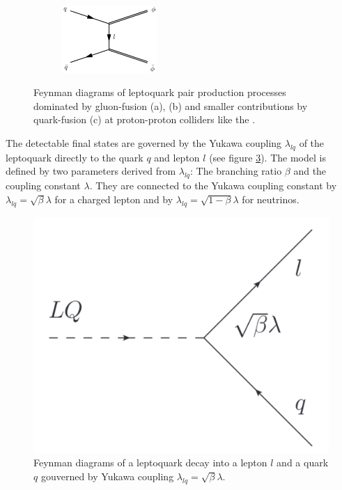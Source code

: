 \begin{figure}
\begin{subfigure}[t]{0.9\textwidth}
                \includegraphics[width=0.4\textwidth]{figures/qff.pdf}
                \label{qfc}
                \end{subfigure}
%
\caption[Feynman diagrams of leptoquark pair production processes at proton-proton colliders like the {\LHC}.]{Feynman diagrams of leptoquark pair production processes dominated by gluon-fusion (a), (b) and smaller contributions by quark-fusion (c) at proton-proton colliders like the {\LHC}. \cite{hunter}}
\label{LQpairs}
\end{figure}
%
%
%
%
%
The detectable final states are governed by the Yukawa coupling $\lambda_{lq}$ of the leptoquark directly to the quark $q$ and lepton $l$ (see figure \ref{YukawaLQ}). The model is defined by two parameters derived from $\lambda_{lq}$: The branching ratio $\beta$ and the coupling constant $\lambda$. They are connected to the Yukawa coupling constant by $\lambda_{lq}=\sqrt{\beta}\lambda$ for a charged lepton and by $\lambda_{lq}=\sqrt{1-\beta}\lambda$ for neutrinos. \cite{currentStatus:13TeVATLAS}\par
%
\begin{figure}[htbp]                                 
 \begin{center}                                       
  \includegraphics[width=0.4\linewidth]{figures/yukawa.pdf} 
   \caption[Feynman diagram of a leptoquark decay governed by Yukawa coupling.]{Feynman diagrams of a leptoquark decay into a lepton $l$ and a quark $q$ gouverned by Yukawa coupling $\lambda_{lq}=\sqrt{\beta}\lambda$. \cite{currentStatus:13TeVATLAS}}
  \label{YukawaLQ}                                     
 \end{center}
\end{figure}
